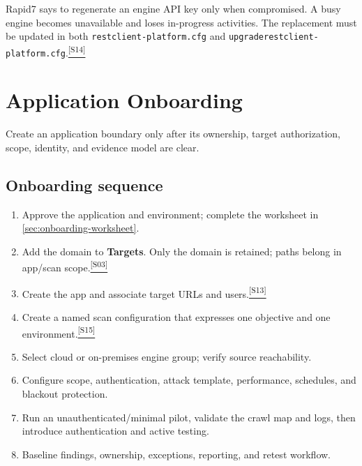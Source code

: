 \documentclass[11pt,letterpaper,oneside]{scrreprt}
\newcommand{\src}[1]{\hyperref[src:#1]{\textsuperscript{\color{R7Orange}[#1]}}}
\newcommand{\uipath}[1]{\textsf{\textbf{#1}}}
\newcommand{\code}[1]{\texttt{#1}}
\newcommand{\chapterlead}[1]{\begin{tcolorbox}[enhanced,colback=R7Light,colframe=R7Light,boxrule=0pt,borderline west={3pt}{0pt}{R7Orange},arc=0pt,left=9pt,right=9pt,top=7pt,bottom=7pt]#1\end{tcolorbox}}
\begin{document}
\begin{safetybox}
Rapid7 says to regenerate an engine API key only when compromised. A busy engine becomes unavailable and loses in-progress activities. The replacement must be updated in both \code{restclient-platform.cfg} and \code{upgraderestclient-platform.cfg}.\src{S14}
\end{safetybox}

\chapter{Application Onboarding}
\chapterlead{Create an application boundary only after its ownership, target authorization, scope, identity, and evidence model are clear.}

\section{Onboarding sequence}
\begin{enumerate}
  \item Approve the application and environment; complete the worksheet in \cref{sec:onboarding-worksheet}.
  \item Add the domain to \uipath{Targets}. Only the domain is retained; paths belong in app/scan scope.\src{S03}
  \item Create the app and associate target URLs and users.\src{S13}
  \item Create a named scan configuration that expresses one objective and one environment.\src{S15}
  \item Select cloud or on-premises engine group; verify source reachability.
  \item Configure scope, authentication, attack template, performance, schedules, and blackout protection.
  \item Run an unauthenticated/minimal pilot, validate the crawl map and logs, then introduce authentication and active testing.
  \item Baseline findings, ownership, exceptions, reporting, and retest workflow.
\end{enumerate}
\end{document}
